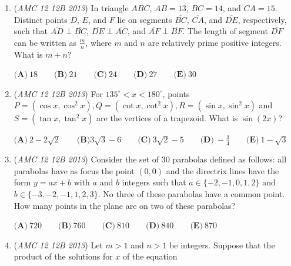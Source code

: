 \begin{enumerate}
 $\textbf{(A)}$ Barbara will win with $2013$ coins and Jenna will win with $2014$ coins. 


 $\textbf{(B)}$ Jenna will win with $2013$ coins, and whoever goes first will win with $2014$ coins. 


 $\textbf{(C)}$ Barbara will win with $2013$ coins, and whoever goes second will win with $2014$ coins.


 $\textbf{(D)}$ Jenna will win with $2013$ coins, and Barbara will win with $2014$ coins.


 $\textbf{(E)}$ Whoever goes first will win with $2013$ coins, and whoever goes second will win with $2014$ coins.


 

	\item (\textit{AMC 12 12B 2013}) In triangle $ABC$, $AB=13$, $BC=14$, and $CA=15$. Distinct points $D$, $E$, and $F$ lie on segments $\overline{BC}$, $\overline{CA}$, and $\overline{DE}$, respectively, such that $\overline{AD}\perp\overline{BC}$, $\overline{DE}\perp\overline{AC}$, and $\overline{AF}\perp\overline{BF}$. The length of segment $\overline{DF}$ can be written as $\frac{m}{n}$, where $m$ and $n$ are relatively prime positive integers. What is $m+n$?


 $\textbf{(A)}\ 18\qquad\textbf{(B)}\ 21\qquad\textbf{(C)}\ 24\qquad\textbf{(D)}\ 27\qquad\textbf{(E)}\ 30$


	\item (\textit{AMC 12 12B 2013}) For $135^\circ < x < 180^\circ$, points $P=(\cos x, \cos^2 x), Q=(\cot x, \cot^2 x), R=(\sin x, \sin^2 x)$ and $S =(\tan x, \tan^2 x)$ are the vertices of a trapezoid. What is $\sin(2x)$?


 $\textbf{(A)}\ 2-2\sqrt{2}\qquad\textbf{(B)} 3\sqrt{3}-6\qquad\textbf{(C)}\ 3\sqrt{2}-5\qquad\textbf{(D)}\ -\frac{3}{4}\qquad\textbf{(E)}\ 1-\sqrt{3}$


	\item (\textit{AMC 12 12B 2013}) Consider the set of $30$ parabolas defined as follows: all parabolas have as focus the point $(0,0)$ and the directrix lines have the form $y=ax+b$ with $a$ and $b$ integers such that $a\in \{-2,-1,0,1,2\}$ and $b\in \{-3,-2,-1,1,2,3\}$. No three of these parabolas have a common point. How many points in the plane are on two of these parabolas?


 $\textbf{(A)}\ 720\qquad\textbf{(B)}\ 760\qquad\textbf{(C)}\ 810\qquad\textbf{(D)}\ 840\qquad\textbf{(E)}\ 870$


	\item (\textit{AMC 12 12B 2013}) Let $m>1$ and $n>1$ be integers. Suppose that the product of the solutions for $x$ of the equation


\end{enumerate}
